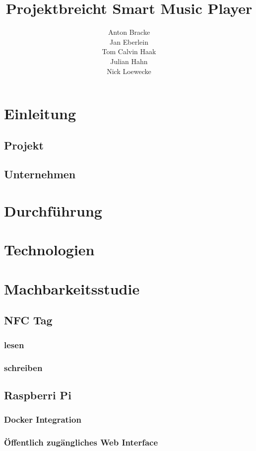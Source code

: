\documentclass[10pt, a4paper, draft]{article}
\title{Projektbreicht Smart Music Player}
\author{Anton Bracke\\Jan Eberlein\\Tom Calvin Haak\\Julian Hahn\\Nick Loewecke}
\begin{document}
\maketitle
\tableofcontents

\section{Einleitung}
\subsection{Projekt}
\subsection{Unternehmen}

\section{Durchführung}

\section{Technologien}

\section{Machbarkeitsstudie}

\subsection{NFC Tag}
\subsubsection{lesen}
\subsubsection{schreiben}

\subsection{Raspberri Pi}
\subsubsection{Docker Integration}
\subsubsection{Öffentlich zugängliches Web Interface}
\end{document}
